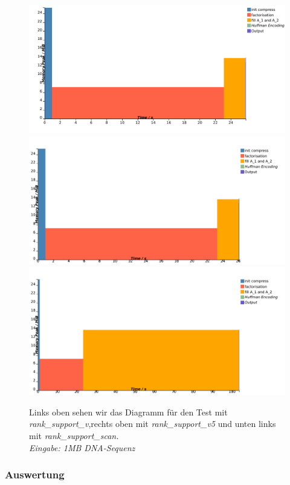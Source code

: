 \documentclass[a4paper,11pt]{scrartcl}%
\theoremstyle{change}
\theoremstyle{nonumberplain}
\theoremstyle{change}
\theoremstyle{nonumberplain}
\theoremstyle{change}
\theoremstyle{nonumberplain}
\begin{document}
\begin{figure}[h]
	\includegraphics[scale=0.27]{./pics/1MB_english_sct3}
	\includegraphics[scale=0.27]{./pics/1MB_english_v5}
	\includegraphics[scale=0.27]{./pics/1MB_english_scan}
	\caption{Links oben sehen wir das Diagramm für den Test mit \textit{rank\_support\_v},rechts oben mit \textit{rank\_support\_v5} und unten links mit \textit{rank\_support\_scan.\\ Eingabe: 1MB DNA-Sequenz}}
	\label{fig:rank_english}
\end{figure}

\subsubsection{Auswertung}
\end{document}
